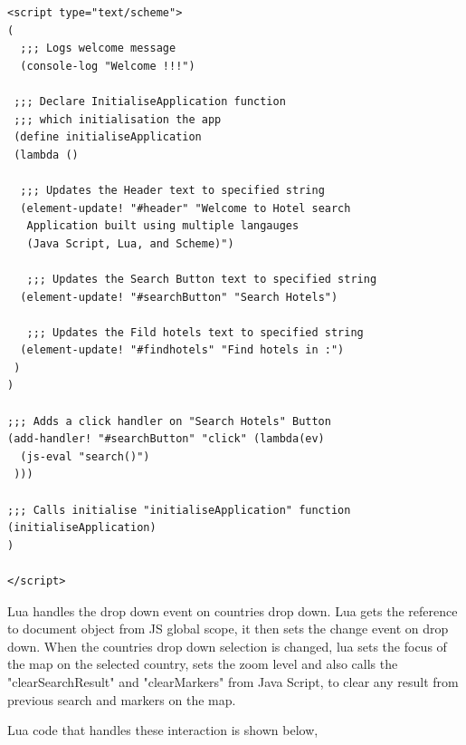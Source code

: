  \begin{lstlisting}[frame=single, style=base]
<script type="text/scheme">
(
  ;;; Logs welcome message
  (console-log "Welcome !!!")
 
 ;;; Declare InitialiseApplication function 
 ;;; which initialisation the app
 (define initialiseApplication
 (lambda ()
  
  ;;; Updates the Header text to specified string
  (element-update! "#header" "Welcome to Hotel search 
   Application built using multiple langauges
   (Java Script, Lua, and Scheme)")
  
   ;;; Updates the Search Button text to specified string
  (element-update! "#searchButton" "Search Hotels")
  
   ;;; Updates the Fild hotels text to specified string
  (element-update! "#findhotels" "Find hotels in :")
 )
)

;;; Adds a click handler on "Search Hotels" Button
(add-handler! "#searchButton" "click" (lambda(ev)
  (js-eval "search()")
 )))
 
;;; Calls initialise "initialiseApplication" function
(initialiseApplication)
)

</script>
 \end{lstlisting}
 
Lua handles the drop down event on countries drop down. Lua gets the reference to document object from JS global scope, it then sets the change event on drop down. When the countries drop down selection is changed, lua sets the focus of the map on the selected country, sets the zoom level and also calls the "clearSearchResult" and "clearMarkers" from Java Script, to clear any result from previous search and markers on the map. 

Lua code that handles these interaction is shown below, 
 
